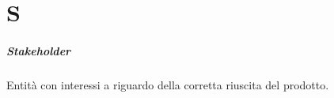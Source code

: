 \chapter{S}
\paragraph*{Stakeholder}
Entità con interessi a riguardo della corretta riuscita del prodotto.

